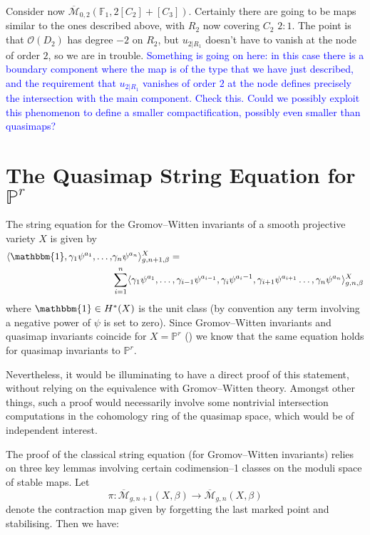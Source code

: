 \documentclass[11pt]{amsart}
\newcommand{\M}[4]{\overline{\mathcal M}_{#1,#2}(#3,#4)}
\newcommand{\PP}{\mathbb P}
\renewcommand{\to}{\rightarrow}
\theoremstyle{plain}
\theoremstyle{definition}
\begin{document}
Consider now $\M{0}{2}{\mathbb F_1}{2[C_2]+[C_3]}$. Certainly there are going to be maps similar to the ones described above, with $R_2$ now covering $C_2$ $2\colon 1$. The point is that $\mathcal O(D_2)$ has degree $-2$ on $R_2$, but $u_{2|R_1}$ doesn't have to vanish at the node of order $2$, so we are in trouble. \textcolor{blue}{Something is going on here: in this case there is a boundary component where the map is of the type that we have just described, and the requirement that $u_{2|R_1}$ vanishes of order $2$ at the node defines precisely the intersection with the main component. Check this. Could we possibly exploit this phenomenon to define a smaller compactification, possibly even smaller than quasimaps?}

\section{The Quasimap String Equation for $\PP^r$}

The string equation for the Gromov--Witten invariants of a smooth projective variety $X$ is given by
\begin{align*} \langle \mathbbm{1} , \gamma_1 \psi^{a_1} , \ldots, & \gamma_n \psi^{a_n} \rangle_{g,n+1,\beta}^X = \\
&  \sum_{i=1}^n \langle \gamma_1 \psi^{a_1}, \ldots, \gamma_{i-1} \psi^{a_{i-1}} , \gamma_i \psi^{a_i - 1} , \gamma_{i+1} \psi^{a_{i+1}} \ldots, \gamma_n \psi^{a_n} \rangle_{g,n,\beta}^X \end{align*}
where $\mathbbm{1} \in H^*(X)$ is the unit class (by convention any term involving a negative power of $\psi$ is set to zero). Since Gromov--Witten invariants and quasimap invariants coincide for $X=\PP^r$ (\cite[Section 5.4]{Manolache-Push}) we know that the same equation holds for quasimap invariants to $\PP^r$.

Nevertheless, it would be illuminating to have a direct proof of this statement, without relying on the equivalence with Gromov--Witten theory. Amongst other things, such a proof would necessarily involve some nontrivial intersection computations in the cohomology ring of the quasimap space, which would be of independent interest.

The proof of the classical string equation (for Gromov--Witten invariants) relies on three key lemmas involving certain codimension--1 classes on the moduli space of stable maps. Let
\begin{equation*} \pi : \M{g}{n+1}{X}{\beta} \to \M{g}{n}{X}{\beta}\end{equation*}
denote the contraction map given by forgetting the last marked point and stabilising. Then we have:
\end{document}
